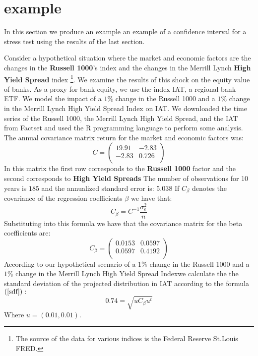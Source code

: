 \documentclass[a4paper]{amsart}
\begin{document}
\section{example}
In this section we produce an example an example of a confidence interval for a stress test using the results of the last section.

Consider a hypothetical situation where the market and economic factors are the changes in the \textbf{Russell 1000}'s index and the changes in the Merrill Lynch \textbf{High Yield Spread} index \footnote{The source of the data for various indices is the Federal Reserve St.Louis FRED.}.  We examine the results of this shock on the equity value of banks. As a proxy for bank equity, we use the index IAT, a regional bank ETF.  We model the impact of a $1\%$ change in the Russell 1000 and a $1\%$ change in the Merrill Lynch High Yield Spread Index  on IAT. We downloaded the time series of the Russell 1000, the Merrill Lynch High Yield Spread, and the IAT from Factset and used the R programming language to perform some analysis. The annual covariance matrix return for the market and economic factors was:
\begin{equation}
C=\begin{pmatrix}
 19.91&-2.83 \\ 
 -2.83& 0.726  \\
\end{pmatrix}
\end{equation}
In this matrix the first row corresponds to the \textbf{Russell 1000} factor and the second corresponds to \textbf{High Yield Spreads}
The number of observations for 10 years is $185$ and the annualized standard error is: $5.038$ If $C_\beta$ denotes the covariance of the regression coefficients $\beta$ we have that: 
\begin{equation}
C_{\beta}=C^{-1}\frac{\sigma_{\epsilon}^2}{n}
\end{equation}
Substituting into this formula we have that the covariance matrix for the beta coefficients are:
\begin{equation}
C_{\beta}=\begin{pmatrix}
0.0153 & 0.0597 \\ 
0.0597 & 0.4192  \\
\end{pmatrix}
\end{equation}
According to our hypothetical scenario of a $1\%$ change in the Russell 1000 and a $1\%$ change in the Merrill Lynch High Yield Spread Indexwe calculate the the standard deviation of the projected distribution in IAT according to the formula $\left(\ref{sdf}\right):$
\begin{equation}
0.74=\sqrt{uC_{\beta}u^t}
\end{equation}
Where $u=(0.01,0.01).$
\end{document}
